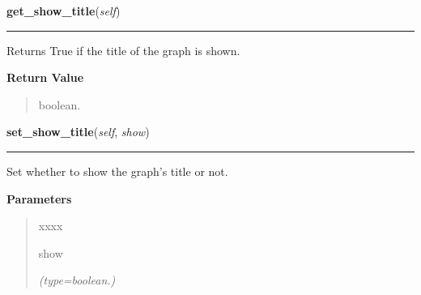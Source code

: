     \label{pygtk_chart:line_chart:Graph:get_show_title}

    \vspace{0.5ex}

\hspace{.8\funcindent}\begin{boxedminipage}{\funcwidth}

    \raggedright \textbf{get\_show\_title}(\textit{self})

    \vspace{-1.5ex}

    \rule{\textwidth}{0.5\fboxrule}
\setlength{\parskip}{2ex}
    Returns True if the title of the graph is shown.

\setlength{\parskip}{1ex}
      \textbf{Return Value}
    \vspace{-1ex}

      \begin{quote}
      boolean.

      \end{quote}

    \end{boxedminipage}

    \label{pygtk_chart:line_chart:Graph:set_show_title}

    \vspace{0.5ex}

\hspace{.8\funcindent}\begin{boxedminipage}{\funcwidth}

    \raggedright \textbf{set\_show\_title}(\textit{self}, \textit{show})

    \vspace{-1.5ex}

    \rule{\textwidth}{0.5\fboxrule}
\setlength{\parskip}{2ex}
    Set whether to show the graph's title or not.

\setlength{\parskip}{1ex}
      \textbf{Parameters}
      \vspace{-1ex}

      \begin{quote}
        \begin{Ventry}{xxxx}

          \item[show]

            {\it (type=boolean.)}

        \end{Ventry}

      \end{quote}

    \end{boxedminipage}

